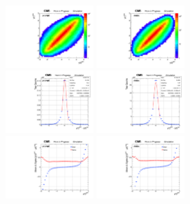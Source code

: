 \begin{figure}
  \begin{center}
    \includegraphics[width=0.30\textwidth]{fig_fullRun2UL/KinRecoResolutions/top_rapidity_genreco_prompt.pdf}
    \includegraphics[width=0.30\textwidth]{fig_fullRun2UL/KinRecoResolutions/top_rapidity_genreco_viatau.pdf}\\
    \includegraphics[width=0.30\textwidth]{fig_fullRun2UL/KinRecoResolutions/top_rapidity_residual_prompt.pdf}
    \includegraphics[width=0.30\textwidth]{fig_fullRun2UL/KinRecoResolutions/top_rapidity_residual_viatau.pdf}\\
    \includegraphics[width=0.30\textwidth]{fig_fullRun2UL/KinRecoResolutions/top_rapidity_multiresidual_prompt.pdf}
    \includegraphics[width=0.30\textwidth]{fig_fullRun2UL/KinRecoResolutions/top_rapidity_multiresidual_viatau.pdf}\\

\end{center}
\end{figure}
